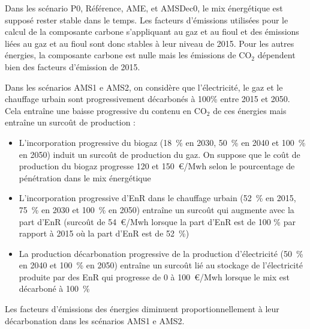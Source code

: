 \documentclass[10.5pt,a4paper]{article}
\begin{document}
{Dans les scénario P0, Référence, AME, et AMSDec0, le mix énergétique est supposé rester stable dans le temps. Les facteurs d'émissions utilisées pour le calcul de la composante carbone s'appliquant au gaz et au fioul et des émissions liées au gaz et au fioul sont donc stables à leur niveau  de 2015. Pour les autres énergies, la composante carbone est nulle mais les émissions de CO$_2$ dépendent bien des facteurs d'émission de 2015.  

Dans les scénarios AMS1 e AMS2, on considère que l'électricité, le gaz et le chauffage urbain sont progressivement décarbonés à 100\% entre 2015 et 2050. Cela entraîne une baisse progressive du contenu en CO$_2$ de ces énergies mais entraîne un surcoût de production : 
\begin{itemize}
	\item L'incorporation progressive du biogaz (18~\% en 2030, 50~\% en 2040 et 100~\% en 2050) induit un surcoût de production du gaz. On suppose que le coût de production du biogaz progresse 120 et 150~€/Mwh selon le pourcentage de pénétration dans le mix énergétique
	\item L'incorporation progressive d'EnR dans le chauffage urbain (52~\% en 2015, 75~\% en 2030 et 100~\% en 2050) entraîne un surcoût qui augmente avec la part d'EnR (surcoût de 54~€/Mwh lorsque la part d'EnR est de 100 \% par rapport à 2015 où la part d'EnR est de 52~\%)
	\item La production décarbonation progressive de la production d'électricité (50~\% en 2040 et 100~\% en 2050) entraîne un surcoût lié au stockage de l'électricité produite par des EnR qui progresse de 0 à 100~€/Mwh lorsque le mix est décarboné à 100~\% 
\end{itemize}


Les facteurs d'émissions des énergies diminuent proportionnellement à leur décarbonation dans les scénarios AMS1 e AMS2. 

}
\end{document}
